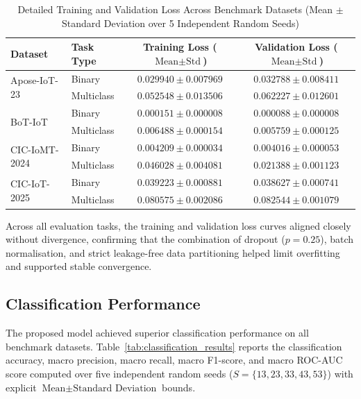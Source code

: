 \documentclass[a4paper,fleqn]{cas-sc}
\begin{document}
\begin{table}
\centering
\caption{Detailed Training and Validation Loss Across Benchmark Datasets (Mean $\pm$ Standard Deviation over 5 Independent Random Seeds)}
\label{tab:training_validation_loss}
\begin{tabular}{llcc}
\toprule
\textbf{Dataset} & \textbf{Task Type} & \textbf{Training Loss} ($\text{Mean} \pm \text{Std}$) & \textbf{Validation Loss} ($\text{Mean} \pm \text{Std}$) \\
\midrule
\multirow{2}{*}{Apose-IoT-23} & Binary & $0.029940 \pm 0.007969$ & $0.032788 \pm 0.008411$ \\
 & Multiclass & $0.052548 \pm 0.013506$ & $0.062227 \pm 0.012601$ \\
\midrule
\multirow{2}{*}{BoT-IoT} & Binary & $0.000151 \pm 0.000008$ & $0.000088 \pm 0.000008$ \\
 & Multiclass & $0.006488 \pm 0.000154$ & $0.005759 \pm 0.000125$ \\
\midrule
\multirow{2}{*}{CIC-IoMT-2024} & Binary & $0.004209 \pm 0.000034$ & $0.004016 \pm 0.000053$ \\
 & Multiclass & $0.046028 \pm 0.004081$ & $0.021388 \pm 0.001123$ \\
\midrule
\multirow{2}{*}{CIC-IoT-2025} & Binary & $0.039223 \pm 0.000881$ & $0.038627 \pm 0.000741$ \\
 & Multiclass & $0.080575 \pm 0.002086$ & $0.082544 \pm 0.001079$ \\
\bottomrule
\end{tabular}
\end{table}

Across all evaluation tasks, the training and validation loss curves aligned closely without divergence, confirming that the combination of dropout ($p=0.25$), batch normalisation, and strict leakage-free data partitioning helped limit overfitting and supported stable convergence.

\subsection{Classification Performance}

The proposed model achieved superior classification performance on all benchmark datasets. Table~\ref{tab:classification_results} reports the classification accuracy, macro precision, macro recall, macro F1-score, and macro ROC-AUC score computed over five independent random seeds ($S=\{13, 23, 33, 43, 53\}$) with explicit $\text{Mean} \pm \text{Standard Deviation}$ bounds.
\end{document}
